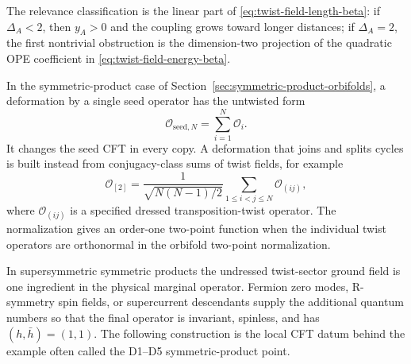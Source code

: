 The relevance classification is the linear part of
\eqref{eq:twist-field-length-beta}: if \(\Delta_A<2\), then \(y_A>0\) and the
coupling grows toward longer distances; if \(\Delta_A=2\), the first
nontrivial obstruction is the dimension-two projection of the quadratic OPE
coefficient in \eqref{eq:twist-field-energy-beta}.

In the symmetric-product case of
Section~\ref{sec:symmetric-product-orbifolds}, a deformation by a single seed
operator has the untwisted form
\begin{equation}
  \mathcal O_{\mathrm{seed},N}
  =
  \sum_{i=1}^N \mathcal O_i .
  \label{eq:symmetric-product-seed-deformation}
\end{equation}
It changes the seed CFT in every copy.  A deformation that joins and splits
cycles is built instead from conjugacy-class sums of twist fields, for
example
\begin{equation}
  \mathcal O_{[2]}
  =
  \frac{1}{\sqrt{N(N-1)/2}}
  \sum_{1\le i<j\le N}\mathcal O_{(ij)} ,
  \label{eq:symmetric-product-normalized-two-cycle}
\end{equation}
where \(\mathcal O_{(ij)}\) is a specified dressed transposition-twist
operator.  The normalization gives an order-one two-point function when the
individual twist operators are orthonormal in the orbifold two-point
normalization.

In supersymmetric symmetric products the undressed twist-sector ground field
is one ingredient in the physical marginal operator.  Fermion zero modes,
R-symmetry spin fields, or supercurrent descendants supply the additional
quantum numbers so that the final operator is invariant, spinless, and has
\((h,\bar h)=(1,1)\).  The following construction is the local CFT datum
behind the example often called the D1--D5 symmetric-product point.

